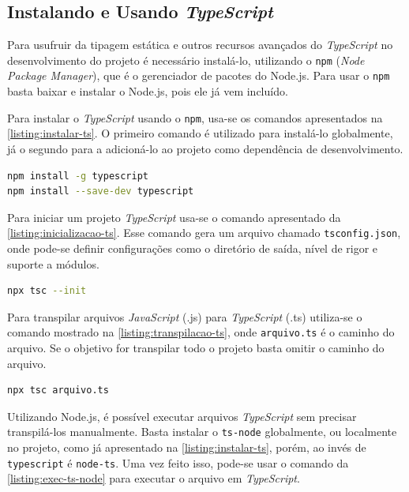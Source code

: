 \subsection{Instalando e Usando \textit{TypeScript}}

Para usufruir da tipagem estática e outros recursos avançados do \textit{TypeScript} no desenvolvimento do projeto é necessário instalá-lo, utilizando o \texttt{npm} (\textit{Node Package Manager}), que é o gerenciador de pacotes do Node.js. Para usar o \texttt{npm} basta baixar e instalar o Node.js, pois ele já vem incluído.

Para instalar o \textit{TypeScript} usando o \texttt{npm}, usa-se os comandos apresentados na \autoref{listing:instalar-ts}. O primeiro comando é utilizado para instalá-lo globalmente, já o segundo para a adicioná-lo ao projeto como dependência de desenvolvimento.

\begin{lstlisting}[language=bash, label=listing:instalar-ts, caption=Comandos de instalação do \textit{TypeScript}.]
npm install -g typescript
npm install --save-dev typescript
\end{lstlisting}

Para iniciar um projeto \textit{TypeScript} usa-se o comando apresentado da \autoref{listing:inicializacao-ts}. Esse comando gera um arquivo chamado \texttt{tsconfig.json}, onde pode-se definir configurações como o diretório de saída, nível de rigor e suporte a módulos.

\begin{lstlisting}[language=bash, label=listing:inicializacao-ts, caption=Comando de inicialização de projeto \textit{TypeScript}.]
npx tsc --init
\end{lstlisting}

Para transpilar arquivos \textit{JavaScript} (.js) para \textit{TypeScript} (.ts) utiliza-se o comando mostrado na \autoref{listing:transpilacao-ts}, onde \texttt{arquivo.ts} é o caminho do arquivo. Se o objetivo for transpilar todo o projeto basta omitir o caminho do arquivo.

\begin{lstlisting}[language=bash, label=listing:transpilacao-ts, caption=Comando de transpilação de arquivos \textit{TypeScript} (.ts) para \textit{JavaScript} (.js).]
npx tsc arquivo.ts
\end{lstlisting}

Utilizando Node.js, é possível executar arquivos \textit{TypeScript} sem precisar transpilá-los manualmente. Basta instalar o \texttt{ts-node} globalmente, ou localmente no projeto, como já apresentado na \autoref{listing:instalar-ts}, porém, ao invés de \texttt{typescript} é \texttt{node-ts}. Uma vez feito isso, pode-se usar o comando da \autoref{listing:exec-ts-node} para executar o arquivo em \textit{TypeScript}.

